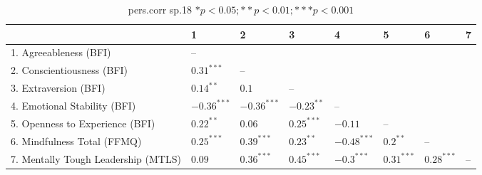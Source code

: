 \begin{table}[ht]
\centering
\begin{tabular}{llllllll}
  \hline
 & 1 & 2 & 3 & 4 & 5 & 6 & 7 \\ 
  \hline
1. Agreeableness (BFI) & -- &  &  &  &  &  &  \\ 
  2. Conscientiousness (BFI) & $0.31^{***}$ & -- &  &  &  &  &  \\ 
  3. Extraversion (BFI) & $0.14^{**}$ & $0.1$ & -- &  &  &  &  \\ 
  4. Emotional Stability (BFI) & $-0.36^{***}$ & $-0.36^{***}$ & $-0.23^{**}$ & -- &  &  &  \\ 
  5. Openness to Experience (BFI) & $0.22^{**}$ & $0.06$ & $0.25^{***}$ & $-0.11$ & -- &  &  \\ 
  6. Mindfulness Total (FFMQ) & $0.25^{***}$ & $0.39^{***}$ & $0.23^{**}$ & $-0.48^{***}$ & $0.2^{**}$ & -- &  \\ 
  7. Mentally Tough Leadership (MTLS) & $0.09$ & $0.36^{***}$ & $0.45^{***}$ & $-0.3^{***}$ & $0.31^{***}$ & $0.28^{***}$ & -- \\ 
   \hline
\end{tabular}
\caption{pers.corr sp.18 $* p < 0.05; ** p < 0.01; *** p < 0.001$} 
\label{freq_corr.pers.corr.sp.18}
\end{table}
